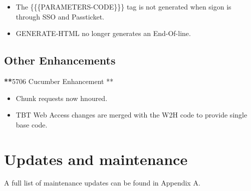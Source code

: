 \documentclass[letterpaper,10pt,english]{sphinxmanual}
\begin{document}
\begin{itemize}
\item {} 
The \{\{\{PARAMETERS-CODE\}\}\} tag is not generated when sigon is through SSO and Passticket.

\end{itemize}

\begin{itemize}
\item {} 
GENERATE-HTML no longer generates an End-Of-line.

\end{itemize}

\newpage


\section{Other Enhancements}
\label{\detokenize{TN201902:other-enhancements}}
{\color{red}\bfseries{}**}5706 Cucumber Enhancement **
\begin{itemize}
\item {} 
Chunk requests now hnoured.

\end{itemize}

\begin{itemize}
\item {} 
TBT Web Access changes are merged with the W2H code to provide single base code.

\end{itemize}


\chapter{Updates and maintenance}
\label{\detokenize{TN201902:updates-and-maintenance}}
A full list of maintenance updates can be found in Appendix A.
\end{document}
